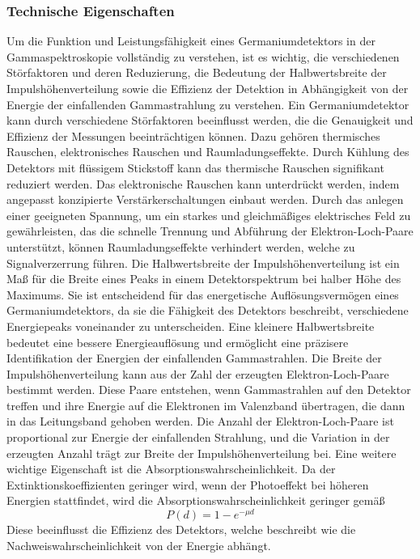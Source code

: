 \subsubsection{Technische Eigenschaften}
Um die Funktion und Leistungsfähigkeit eines Germaniumdetektors in der Gammaspektroskopie vollständig zu verstehen, ist es wichtig,
die verschiedenen Störfaktoren und deren Reduzierung, die Bedeutung der Halbwertsbreite der Impulshöhenverteilung sowie die Effizienz der Detektion in Abhängigkeit von der Energie
der einfallenden Gammastrahlung zu verstehen.
Ein Germaniumdetektor kann durch verschiedene Störfaktoren beeinflusst werden, die die Genauigkeit und Effizienz der Messungen beeinträchtigen können.
Dazu gehören thermisches Rauschen, elektronisches Rauschen und Raumladungseffekte. Durch Kühlung des Detektors mit flüssigem Stickstoff kann das thermische
Rauschen signifikant reduziert werden. Das elektronische Rauschen kann unterdrückt werden, indem angepasst konzipierte Verstärkerschaltungen einbaut werden. Durch das 
anlegen einer geeigneten Spannung, um ein starkes und gleichmäßiges elektrisches Feld zu gewährleisten, das die schnelle Trennung und Abführung der Elektron-Loch-Paare
unterstützt, können Raumladungseffekte verhindert werden, welche zu Signalverzerrung führen. Die Halbwertsbreite der Impulshöhenverteilung ist ein Maß für die Breite eines Peaks 
in einem Detektorspektrum bei halber Höhe des Maximums. Sie ist entscheidend für das energetische Auflösungsvermögen eines Germaniumdetektors, da sie die Fähigkeit des Detektors
beschreibt, verschiedene Energiepeaks voneinander zu unterscheiden. Eine kleinere Halbwertsbreite bedeutet eine bessere Energieauflösung und ermöglicht eine präzisere
Identifikation der Energien der einfallenden Gammastrahlen.
Die Breite der Impulshöhenverteilung kann aus der Zahl der erzeugten Elektron-Loch-Paare bestimmt werden. Diese Paare entstehen, wenn Gammastrahlen auf den Detektor
treffen und ihre Energie auf die Elektronen im Valenzband übertragen, die dann in das Leitungsband gehoben werden. Die Anzahl der Elektron-Loch-Paare ist proportional 
zur Energie der einfallenden Strahlung, und die Variation in der erzeugten Anzahl trägt zur Breite der Impulshöhenverteilung bei.
Eine weitere wichtige Eigenschaft ist die Absorptionswahrscheinlichkeit. Da der Extinktionskoeffizienten geringer wird, wenn der Photoeffekt bei höheren Energien stattfindet,
wird die Absorptionswahrscheinlichkeit geringer gemäß
\begin{equation}
    P(d)=1-e^{-\mu d}
    \label{eq:Absorptionswahrscheinlichkeit}
\end{equation}    
Diese beeinflusst die Effizienz des Detektors, welche beschreibt wie die Nachweiswahrscheinlichkeit von der Energie abhängt.

